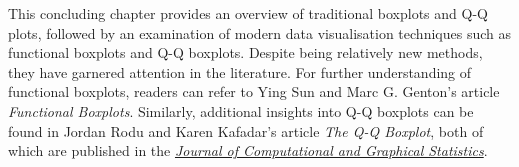 \documentclass{article}\usepackage[]{graphicx}\usepackage[]{xcolor}
\numberwithin{equation}{section}
\begin{document}
\noindent This concluding chapter provides an overview of traditional boxplots and Q-Q plots, followed by an examination of modern data visualisation techniques such as functional boxplots and Q-Q boxplots. Despite being relatively new methods, they have garnered attention in the literature. For further understanding of functional boxplots, readers can refer to Ying Sun and Marc G. Genton's article \textit{Functional Boxplots}. Similarly, additional insights into Q-Q boxplots can be found in Jordan Rodu and Karen Kafadar's article \textit{The Q-Q Boxplot}, both of which are published in the \href{https://www.tandfonline.com/journals/ucgs20}{\textit{Journal of Computational and Graphical Statistics}}.

\newpage  


\printindex
  

\newpage

\end{document}
